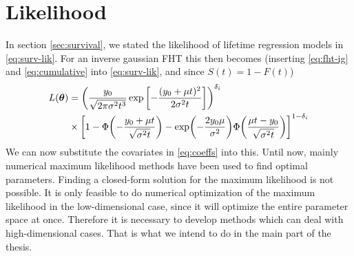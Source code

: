 \section{Likelihood}\label{sec:lik}
In section \ref{sec:survival}, we stated the likelihood of lifetime regression models in \eqref{eq:surv-lik}. For an inverse gaussian FHT this then becomes (inserting \eqref{eq:fht-ig} and \eqref{eq:cumulative} into \eqref{eq:surv-lik}, and since $S(t)=1-F(t)$)
\begin{align}\label{eq:fht-lik}
\begin{split}
L(\btheta)&=\p*{\frac{y_0}{\sqrt{2\pi\sigma^2t^3}}\exp\left[-\frac{(y_0+\mu t)^2}{2\sigma^2t}\right]}^{\delta_i}\\
&\times\sqb*{1-\Phi\p*{-\frac{y_0+\mu t}{\sqrt{\sigma^2t}}}-\exp\p*{-\frac{2y_0\mu}{\sigma^2}}\Phi\p*{\frac{\mu t-y_0}{\sqrt{\sigma^2t}}}}^{1-\delta_i}
\end{split}
\end{align}
We can now substitute the covariates in \eqref{eq:coeffs} into this. Until now, mainly numerical maximum likelihood methods have been used to find optimal parameters. Finding a closed-form solution for the maximum likelihood is not possible. It is only feasible to do numerical optimization of the maximum likelihood in the low-dimensional case, since it will optimize the entire parameter space at once. Therefore it is necessary to develop methods which can deal with high-dimensional cases. That is what we intend to do in the main part of the thesis.